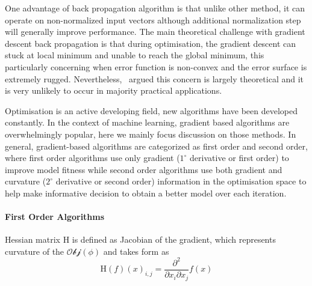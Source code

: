 One advantage of back propagation algorithm is that unlike other method, it can operate on non-normalized input vectors although additional normalization step will generally improve performance. \cite{Buckland:2002} The main theoretical challenge with gradient descent back propagation is that during optimisation, the gradient descent can stuck at local minimum and unable to reach the global minimum, this particularly concerning when error function is non-convex and the error surface is extremely rugged. Nevertheless,~\citet{LeCun_2015} argued this concern is largely theoretical and it is very unlikely to occur in majority practical applications.

Optimisation is an active developing field, new algorithms have been developed constantly. In the context of machine learning, gradient based algorithms are overwhelmingly popular, here we mainly focus discussion on those methods. In general, gradient-based algorithms are categorized as first order and second order, where first order algorithms use only gradient ($1^\circ$ derivative or first order) to improve model fitness while second order algorithms use both gradient and curvature ($2^\circ$ derivative or second order) information in the optimisation space to help make informative decision to obtain a better model over each iteration.  
\paragraph {First Order Algorithms}

Hessian matrix $\mathrm{H}$ is defined as Jacobian of the gradient, which represents curvature of the $\mathcal{Obj}(\phi)$ and takes form as 
\begin{equation}
    \mathrm{H}(f)(x)_{i,j} = \frac{\partial^2}{\partial x_i \partial x_j}f(x)
\end{equation}
